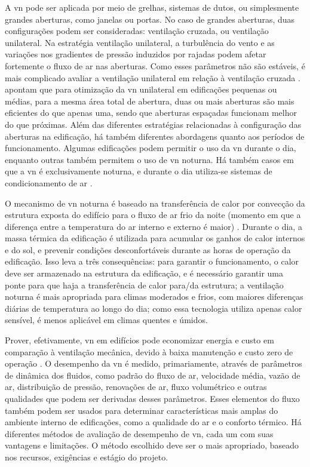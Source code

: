 \documentclass[brazil,hardcopy,openany]{ufscthesis} %
\begin{document}
A \acrshort{vn} pode ser aplicada por meio de grelhas, sistemas de dutos, ou simplesmente grandes aberturas, como janelas ou portas. No caso de grandes aberturas, duas configurações podem ser consideradas: ventilação cruzada, ou ventilação unilateral. Na estratégia ventilação unilateral, a turbulência do vento e as variações nos gradientes de pressão induzidos por rajadas podem afetar fortemente o fluxo de ar nas aberturas.
Como esses parâmetros não são estáveis, é mais complicado avaliar a ventilação unilateral em relação à ventilação cruzada \cite{Freire2013}.
 apontam que para otimização da \acrshort{vn} unilateral em edificações pequenas ou médias, para a mesma área total de abertura, duas ou mais aberturas são mais eficientes do que apenas uma, sendo que aberturas espaçadas funcionam melhor do que próximas.	%
Além das diferentes estratégias relacionadas à configuração das aberturas na edificação, há também diferentes abordagens quanto aos períodos de funcionamento. Algumas edificações podem permitir o uso da \acrshort{vn} durante o dia, enquanto outras também permitem o uso de \acrshort{vn} noturna. Há também casos em que a \acrshort{vn} é exclusivamente noturna, e durante o dia utiliza-se sistemas de condicionamento de ar \cite{Pesic2018}.

O mecanismo de \acrlong{vn} noturna é baseado na transferência de calor por convecção da estrutura exposta do edifício para o fluxo de ar frio da noite (momento em que a diferença entre a temperatura do ar interno e externo é maior) \cite{Breesch2010}. Durante o dia, a massa térmica da	edificação é utilizada para acumular os ganhos de calor internos e do sol, e prevenir condições desconfortáveis durante as horas de operação da edificação.	
Isso leva a três consequências: para garantir o funcionamento, o calor deve ser armazenado na estrutura da edificação, e é necessário garantir uma ponte para que haja a transferência de calor para/da estrutura; a ventilação noturna é mais apropriada para climas moderados e frios, com maiores diferenças diárias de temperatura ao longo do dia; como essa tecnologia utiliza apenas calor sensível, é menos aplicável em climas quentes e úmidos.

Prover, efetivamente, \acrshort{vn} em edifícios pode economizar energia e custo em comparação à ventilação mecânica, devido à baixa manutenção e custo zero de operação \cite{Omrani2017}. O desempenho da \acrshort{vn} é medido, primariamente, através de parâmetros de dinâmica dos fluidos, como padrão do fluxo de ar, velocidade média, vazão de ar, distribuição de pressão, renovações de ar, fluxo volumétrico e outras qualidades que podem ser derivadas desses parâmetros.
Esses elementos do fluxo também podem ser usados para determinar características mais amplas do ambiente interno de edificações, como a qualidade do ar e o conforto térmico. Há diferentes métodos de avaliação de desempenho de \acrshort{vn}, cada um com suas vantagens e limitações. O método escolhido deve ser o mais apropriado, baseado nos recursos, exigências e estágio do projeto.
\end{document}
